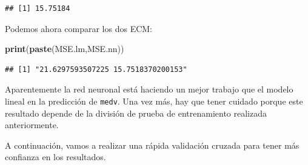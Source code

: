 \documentclass[]{book}
\newenvironment{Shaded}{\begin{snugshade}}{\end{snugshade}}
\newcommand{\KeywordTok}[1]{\textcolor[rgb]{0.13,0.29,0.53}{\textbf{#1}}}
\newcommand{\DataTypeTok}[1]{\textcolor[rgb]{0.13,0.29,0.53}{#1}}
\newcommand{\DecValTok}[1]{\textcolor[rgb]{0.00,0.00,0.81}{#1}}
\newcommand{\FloatTok}[1]{\textcolor[rgb]{0.00,0.00,0.81}{#1}}
\newcommand{\StringTok}[1]{\textcolor[rgb]{0.31,0.60,0.02}{#1}}
\newcommand{\OperatorTok}[1]{\textcolor[rgb]{0.81,0.36,0.00}{\textbf{#1}}}
\newcommand{\NormalTok}[1]{#1}
\begin{document}
\begin{verbatim}
## [1] 15.75184
\end{verbatim}

Podemos ahora comparar los dos ECM:

\begin{Shaded}
\begin{Highlighting}[]
\KeywordTok{print}\NormalTok{(}\KeywordTok{paste}\NormalTok{(MSE.lm,MSE.nn))}
\end{Highlighting}
\end{Shaded}

\begin{verbatim}
## [1] "21.6297593507225 15.7518370200153"
\end{verbatim}

Aparentemente la red neuronal está haciendo un mejor trabajo que el
modelo lineal en la predicción de \texttt{medv}. Una vez más, hay que
tener cuidado porque este resultado depende de la división de prueba de
entrenamiento realizada anteriormente.

A continuación, vamos a realizar una rápida validación cruzada para
tener más confianza en los resultados.

\begin{Shaded}
\end{Shaded}
\end{document}
